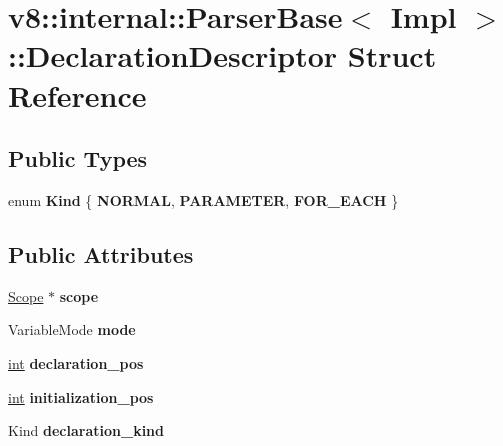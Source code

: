 \hypertarget{structv8_1_1internal_1_1ParserBase_1_1DeclarationDescriptor}{}\section{v8\+:\+:internal\+:\+:Parser\+Base$<$ Impl $>$\+:\+:Declaration\+Descriptor Struct Reference}
\label{structv8_1_1internal_1_1ParserBase_1_1DeclarationDescriptor}
\subsection*{Public Types}
\begin{DoxyCompactItemize}
\item 
\mbox{\label{structv8_1_1internal_1_1ParserBase_1_1DeclarationDescriptor_af989c7beb25ab65f21e70640fe4840fb}} 
enum {\bfseries Kind} \{ {\bfseries N\+O\+R\+M\+AL}, 
{\bfseries P\+A\+R\+A\+M\+E\+T\+ER}, 
{\bfseries F\+O\+R\+\_\+\+E\+A\+CH}
 \}
\end{DoxyCompactItemize}
\subsection*{Public Attributes}
\begin{DoxyCompactItemize}
\item 
\mbox{\label{structv8_1_1internal_1_1ParserBase_1_1DeclarationDescriptor_aa23aa9c3c34bd1a48e69e1ae49189019}} 
\mbox{\hyperlink{classv8_1_1internal_1_1Scope}{Scope}} $\ast$ {\bfseries scope}
\item 
\mbox{\label{structv8_1_1internal_1_1ParserBase_1_1DeclarationDescriptor_a58a600f13ed6cc296b0fe87d82179212}} 
Variable\+Mode {\bfseries mode}
\item 
\mbox{\label{structv8_1_1internal_1_1ParserBase_1_1DeclarationDescriptor_a44bdd3d7320e3ff790770806c3d2206a}} 
\mbox{\hyperlink{classint}{int}} {\bfseries declaration\+\_\+pos}
\item 
\mbox{\label{structv8_1_1internal_1_1ParserBase_1_1DeclarationDescriptor_ac19c3ffa5c1cee8c1fdfa27a19dae5ec}} 
\mbox{\hyperlink{classint}{int}} {\bfseries initialization\+\_\+pos}
\item 
\mbox{\label{structv8_1_1internal_1_1ParserBase_1_1DeclarationDescriptor_a125110747ae340fc0cba0ac4253819a7}} 
Kind {\bfseries declaration\+\_\+kind}
\end{DoxyCompactItemize}


